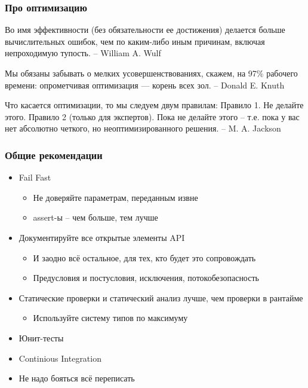 \documentclass[xetex,mathserif,serif]{beamer}
\begin{document}
	\begin{frame}
		\frametitle{Про оптимизацию}
		Во имя эффективности (без обязательности ее достижения) делается больше вычислительных ошибок, чем по каким-либо иным причинам, включая непроходимую тупость. \newline
		-- William A. Wulf 
	
		\vspace{3mm}
		Мы обязаны забывать о мелких усовершенствованиях, ска­жем, на 97\% рабочего времени: опрометчивая оптимизация --- корень всех зол. \newline
		-- Donald E. Knuth
	
		\vspace{3mm}
		Что касается оптимизации, то мы следуем двум правилам: \newline
		Правило 1. Не делайте этого.  \newline
		Правило 2 (только для экспертов). Пока не делайте этого -- т.е. пока у вас нет абсолютно четкого, но неоптимизированного решения. \newline
		-- M. A. Jackson
	\end{frame}

	\begin{frame}
		\frametitle{Общие рекомендации}
		\begin{itemize}
			\item Fail Fast
			\begin{itemize}
				\item Не доверяйте параметрам, переданным извне
				\item assert-ы -- чем больше, тем лучше
			\end{itemize}
			\item Документируйте все открытые элементы API
			\begin{itemize}
				\item И заодно всё остальное, для тех, кто будет это сопровождать
				\item Предусловия и постусловия, исключения, потокобезопасность
			\end{itemize}
			\item Статические проверки и статический анализ лучше, чем проверки в рантайме
			\begin{itemize}
				\item Используйте систему типов по максимуму
			\end{itemize}
			\item Юнит-тесты
			\item Continious Integration
			\item Не надо бояться всё переписать
		\end{itemize}
	\end{frame}
\end{document}

